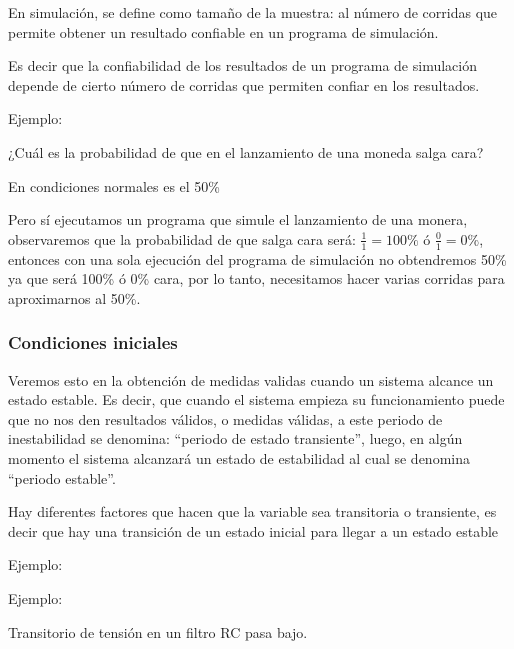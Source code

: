 \documentclass[11pt,letterpaper]{report}
\begin{document}
En simulación, se define como tamaño de la muestra: al número de corridas que permite obtener un resultado confiable en un programa de simulación.

Es decir que la confiabilidad de los resultados de un programa de simulación depende de cierto número de corridas que permiten confiar en los resultados.

Ejemplo:

¿Cuál es la probabilidad de que en el lanzamiento de una moneda salga cara?

En condiciones normales es el 50\%

Pero sí ejecutamos un programa que simule el lanzamiento de una monera, observaremos que la probabilidad de que salga cara será: $\frac{1}{1} = 100\%$ ó $\frac{0}{1} = 0\%$, entonces con una sola ejecución del programa de simulación no obtendremos 50\% ya que será 100\% ó 0\% cara, por lo tanto, necesitamos hacer varias corridas para aproximarnos al 50\%.

\subsubsection*{Condiciones iniciales}

Veremos esto en la obtención de medidas validas cuando un sistema alcance un estado estable. Es decir, que cuando el sistema empieza su funcionamiento puede que no nos den resultados válidos, o medidas válidas, a este periodo de inestabilidad se denomina: ``periodo de estado transiente'', luego, en algún momento el sistema alcanzará un estado de estabilidad al cual se denomina ``periodo estable''.

Hay diferentes factores que hacen que la variable sea transitoria o transiente, es decir que hay una transición de un estado inicial para llegar a un estado estable

Ejemplo:

\begin{center}
\end{center}

Ejemplo:

\begin{center}

\vspace{0.1cm}
Transitorio de tensión en un filtro RC pasa bajo.
\end{center}
\end{document}
